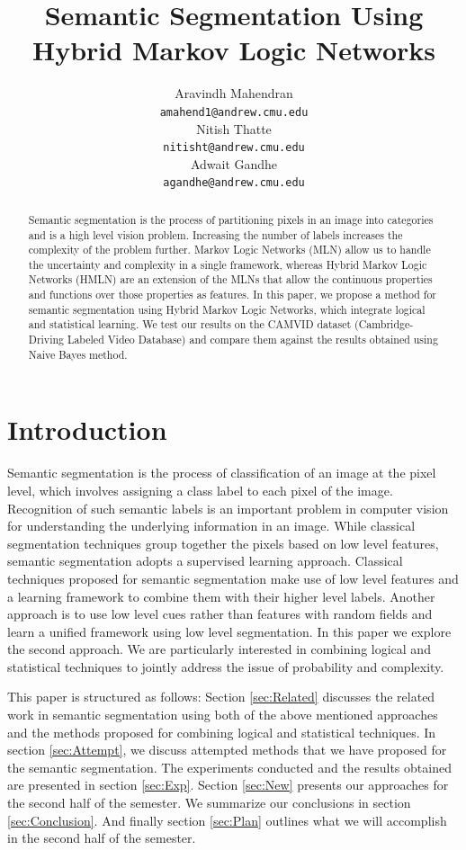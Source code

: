 \documentclass{article} %
\title{Semantic Segmentation Using Hybrid Markov Logic Networks}
\author{
Aravindh Mahendran \\
\texttt{amahend1@andrew.cmu.edu} \\ 
\And
Nitish Thatte \\
\texttt{nitisht@andrew.cmu.edu} \\
\AND
Adwait Gandhe \\
\texttt{agandhe@andrew.cmu.edu} \\
}
\begin{document}
\maketitle

\begin{abstract}
Semantic segmentation is the process of partitioning pixels in an image into categories and is a high level vision problem. Increasing the number of labels increases the complexity of the problem further. Markov Logic Networks (MLN) allow us to handle the uncertainty and complexity in a single framework, whereas Hybrid Markov Logic Networks (HMLN) are an extension of the MLNs that allow the continuous properties and functions over those properties as features.  In this paper, we propose a method for semantic segmentation using Hybrid Markov Logic Networks, which integrate logical and statistical learning. We test our results on the CAMVID dataset (Cambridge-Driving Labeled Video Database) and compare them against the results obtained using Naive Bayes method. 
\end{abstract}


\section{Introduction}
\label{sec:Intro}
Semantic segmentation is the process of classification of an image at the pixel level, which involves assigning a class label to each pixel of the image. Recognition of such semantic labels is an important problem in computer vision for understanding the underlying information in an image. While classical segmentation techniques group together the pixels based on low level features, semantic segmentation adopts a supervised learning approach. Classical techniques proposed for semantic segmentation make use of low level features and a learning framework to combine them with their higher level labels. Another approach is to use low level cues rather than features with random fields and learn a unified framework using low level segmentation. In this paper we explore the second approach. We are particularly interested in combining logical and statistical techniques to jointly address the issue of probability and complexity. 

This paper is structured as follows: Section \ref{sec:Related} discusses the related work in semantic segmentation using both of the above mentioned approaches and the methods proposed for combining logical and statistical techniques. In section \ref{sec:Attempt}, we discuss attempted methods that we have proposed for the semantic segmentation. The experiments conducted and the results obtained are presented in section \ref{sec:Exp}. Section \ref{sec:New} presents our approaches for the second half of the semester. We summarize our conclusions in section \ref{sec:Conclusion}. And finally section \ref{sec:Plan} outlines what we will accomplish in the second half of the semester.
\end{document}
